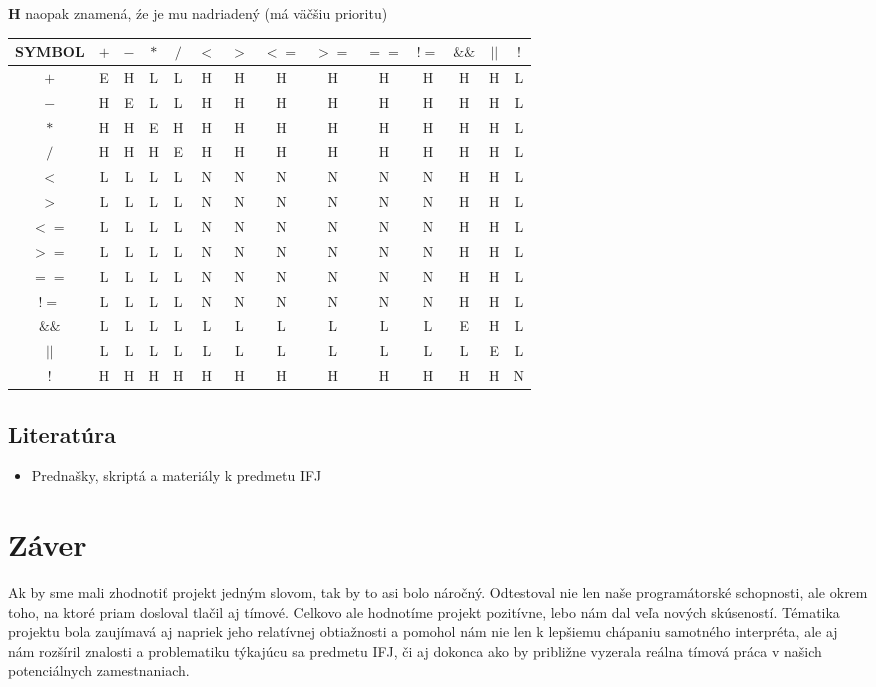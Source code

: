 \documentclass[12pt, a4paper]{article}
\begin{document}
        \textbf{H} naopak znamená, źe je mu nadriadený (má väčšiu prioritu)

        \begin{center}
            \begin{tabular}{| c | c | c | c | c | c | c | c | c | c | c | c | c | c |}
            \hline
            SYMBOL & $+$ & $-$ & $*$ & $/$ & $<$ & $>$ & $<=$ & $>=$ & $==$ & $!=$ & $\&\&$ & $||$ & $!$\\
            \hline
            $+$ & E & H & L & L & H & H & H & H & H & H & H & H & L\\
            $-$ & H & E & L & L & H & H & H & H & H & H & H & H & L\\
            $*$ & H & H & E & H & H & H & H & H & H & H & H & H & L\\
            $/$ & H & H & H & E & H & H & H & H & H & H & H & H & L\\
            $<$ & L & L & L & L & N & N & N & N & N & N & H & H & L\\
            $>$ & L & L & L & L & N & N & N & N & N & N & H & H & L\\
            $<=$ & L & L & L & L & N & N & N & N & N & N & H & H & L\\
            $>=$ & L & L & L & L & N & N & N & N & N & N & H & H & L\\
            $==$ & L & L & L & L & N & N & N & N & N & N & H & H & L\\
            $!=$ & L & L & L & L & N & N & N & N & N & N & H & H & L\\
            $\&\&$ & L & L & L & L & L & L & L & L & L & L & E & H & L\\
            $||$ & L & L & L & L & L & L & L & L & L & L & L & E & L\\
            $!$ & H & H & H & H & H & H & H & H & H & H & H & H & N\\
            \hline
            \end{tabular}
        \end{center}
        \subsection{Literatúra}
        \begin{itemize}
            \item Prednašky, skriptá a materiály k predmetu IFJ
        \end{itemize}
        \newpage
    \section{Záver}
    Ak by sme mali zhodnotiť projekt jedným slovom, tak by to asi bolo náročný. Odtestoval nie len naše programátorské schopnosti, ale okrem toho, na ktoré priam dosloval tlačil aj tímové. Celkovo ale hodnotíme projekt pozitívne, lebo nám dal veľa nových skúseností. Tématika projektu bola zaujímavá aj napriek jeho relatívnej obtiažnosti a pomohol nám nie len k lepšiemu chápaniu samotného interpréta, ale aj nám rozšíril znalosti a problematiku týkajúcu sa predmetu IFJ, či aj dokonca ako by približne vyzerala reálna tímová práca v našich potenciálnych zamestnaniach.
\end{document}
